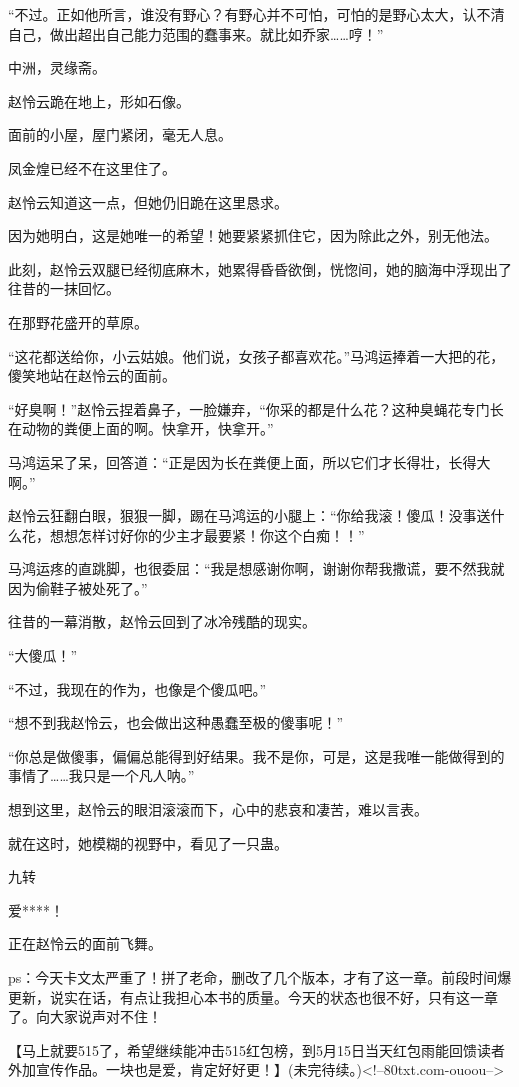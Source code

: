 \begin{this_body}
“不过。正如他所言，谁没有野心？有野心并不可怕，可怕的是野心太大，认不清自己，做出超出自己能力范围的蠢事来。就比如乔家……哼！”

中洲，灵缘斋。

赵怜云跪在地上，形如石像。

面前的小屋，屋门紧闭，毫无人息。

凤金煌已经不在这里住了。

赵怜云知道这一点，但她仍旧跪在这里恳求。

因为她明白，这是她唯一的希望！她要紧紧抓住它，因为除此之外，别无他法。

此刻，赵怜云双腿已经彻底麻木，她累得昏昏欲倒，恍惚间，她的脑海中浮现出了往昔的一抹回忆。

在那野花盛开的草原。

“这花都送给你，小云姑娘。他们说，女孩子都喜欢花。”马鸿运捧着一大把的花，傻笑地站在赵怜云的面前。

“好臭啊！”赵怜云捏着鼻子，一脸嫌弃，“你采的都是什么花？这种臭蝇花专门长在动物的粪便上面的啊。快拿开，快拿开。”

马鸿运呆了呆，回答道：“正是因为长在粪便上面，所以它们才长得壮，长得大啊。”

赵怜云狂翻白眼，狠狠一脚，踢在马鸿运的小腿上：“你给我滚！傻瓜！没事送什么花，想想怎样讨好你的少主才最要紧！你这个白痴！！”

马鸿运疼的直跳脚，也很委屈：“我是想感谢你啊，谢谢你帮我撒谎，要不然我就因为偷鞋子被处死了。”

往昔的一幕消散，赵怜云回到了冰冷残酷的现实。

“大傻瓜！”

“不过，我现在的作为，也像是个傻瓜吧。”

“想不到我赵怜云，也会做出这种愚蠢至极的傻事呢！”

“你总是做傻事，偏偏总能得到好结果。我不是你，可是，这是我唯一能做得到的事情了……我只是一个凡人呐。”

想到这里，赵怜云的眼泪滚滚而下，心中的悲哀和凄苦，难以言表。

就在这时，她模糊的视野中，看见了一只蛊。

九转

爱****！

正在赵怜云的面前飞舞。

ps：今天卡文太严重了！拼了老命，删改了几个版本，才有了这一章。前段时间爆更新，说实在话，有点让我担心本书的质量。今天的状态也很不好，只有这一章了。向大家说声对不住！

【马上就要515了，希望继续能冲击515红包榜，到5月15日当天红包雨能回馈读者外加宣传作品。一块也是爱，肯定好好更！】(未完待续。)<!--80txt.com-ouoou-->

\end{this_body}

